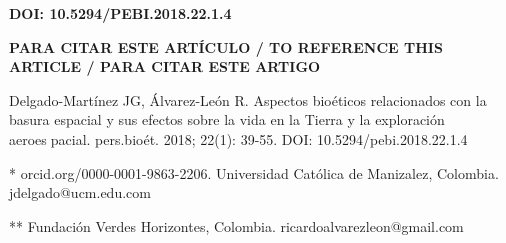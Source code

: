 \documentclass[12pt,letterpaper]{article}
\begin{document}
\begin{flushleft}
\footnotesize {\textbf{DOI: 10.5294/PEBI.2018.22.1.4}}

{\textbf{PARA CITAR ESTE ARTÍCULO / TO REFERENCE THIS ARTICLE / PARA CITAR ESTE ARTIGO}}

Delgado-Martínez JG, Álvarez-León R. Aspectos bioéticos relacionados con la basura espacial y sus efectos sobre la vida en la Tierra y la exploración aeroespacial. pers.bioét. 2018; 22(1): 39-55. DOI: 10.5294/pebi.2018.22.1.4
\end{flushleft} 
\begin{multicols}{2}
\begin{flushleft}
\footnotesize
* orcid.org/0000-0001-9863-2206. Universidad Católica de Manizalez, Colombia. jdelgado@ucm.edu.com

** Fundación Verdes Horizontes, Colombia. 
ricardoalvarezleon@gmail.com
\end{flushleft}
\end{multicols}
\newpage
\end{document}
